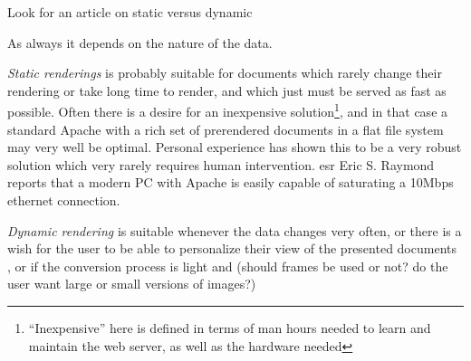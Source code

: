 
      

\textsf{Look for an article on static versus dynamic}

As always it depends on the nature of the data.

\textit{Static renderings} is probably suitable for documents which
rarely change their rendering or take long time to render, and which
just must be served as fast as possible.  Often there is a desire for
an inexpensive solution\footnote{``Inexpensive'' here is defined in
  terms of man hours needed to learn and maintain the web server, as
  well as the hardware needed}, and in that case a standard Apache
with a rich set of prerendered documents in a flat file system may
very well be optimal.  Personal experience has shown this to be a very
robust solution which very rarely requires human intervention.
\textsf{\textsf{esr} Eric S. Raymond reports that a modern PC with Apache is
easily capable of saturating a 10Mbps ethernet connection.
}

\textsf{
\textit{Dynamic rendering} is suitable whenever the data changes very
often, or there is a wish for the user to be able to personalize their
view of the presented documents , or if the conversion
process is light and
(should frames be used or not?  do the
user want large or small versions of images?)
}





